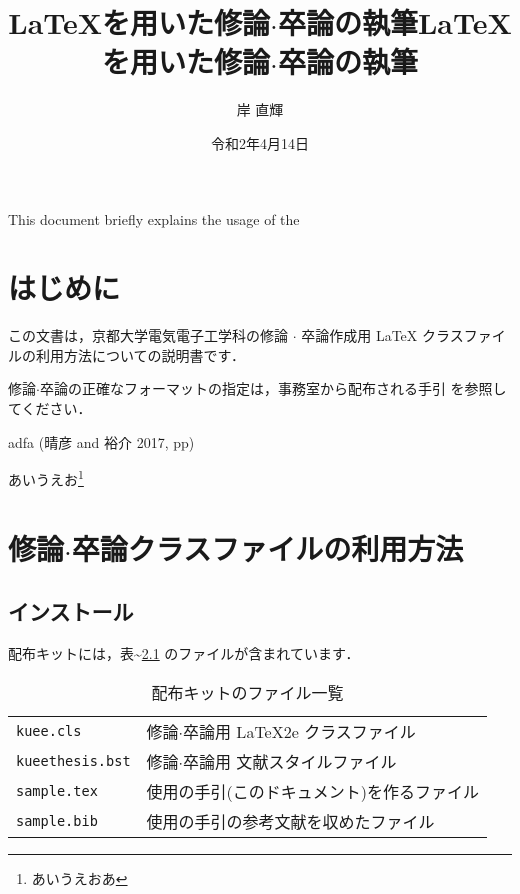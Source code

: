 \documentclass[
  sotsuron]{kuee}
\title{\LaTeX を用いた修論$\cdot$卒論の執筆}
\title{\LaTeX を用いた修論\(\cdot\)卒論の執筆}
\author{岸 直輝}
\date{令和2年4月14日}
\begin{document}
\maketitle

\begin{eabstract}This document briefly explains the usage of the\end{eabstract}

\def\lstlistingname{ソースコード}

{
        \setcounter{tocdepth}{2}
    \tableofcontents
  }
\hypertarget{ux306fux3058ux3081ux306b}{%
\chapter{はじめに}\label{ux306fux3058ux3081ux306b}}

この文書は，京都大学電気電子工学科の修論 \(\cdot\) 卒論作成用 \LaTeX
クラスファイルの利用方法についての説明書です．

修論\(\cdot\)卒論の正確なフォーマットの指定は，事務室から配布される手引
を参照してください．

\cite{GuideBook}

adfa (晴彦 and 裕介 2017, pp)

あいうえお\footnote{あいうえおあ}

\hypertarget{ux4feeux8ad6cdotux5352ux8ad6ux30afux30e9ux30b9ux30d5ux30a1ux30a4ux30ebux306eux5229ux7528ux65b9ux6cd5}{%
\chapter{\texorpdfstring{修論\(\cdot\)卒論クラスファイルの利用方法}{修論\textbackslash cdot卒論クラスファイルの利用方法}}\label{ux4feeux8ad6cdotux5352ux8ad6ux30afux30e9ux30b9ux30d5ux30a1ux30a4ux30ebux306eux5229ux7528ux65b9ux6cd5}}

\hypertarget{ux30a4ux30f3ux30b9ux30c8ux30fcux30eb}{%
\section{インストール}\label{ux30a4ux30f3ux30b9ux30c8ux30fcux30eb}}

配布キットには，表\textasciitilde{}\ref{tab:kit}
のファイルが含まれています．

\begin{table}
  \caption{配布キットのファイル一覧}\label{tab:kit}
  \begin{center}
    \begin{tabular}{ll}
      \verb+kuee.cls+ & 修論$\cdot$卒論用 \LaTeX2e{} クラスファイル       \\
      \verb+kueethesis.bst+ & 修論$\cdot$卒論用 文献スタイルファイル \\
      \verb+sample.tex+ & 使用の手引(このドキュメント)を作るファイル        \\
      \verb+sample.bib+ & 使用の手引の参考文献を収めたファイル              \\
    \end{tabular}
  \end{center}
\end{table}
\end{document}

